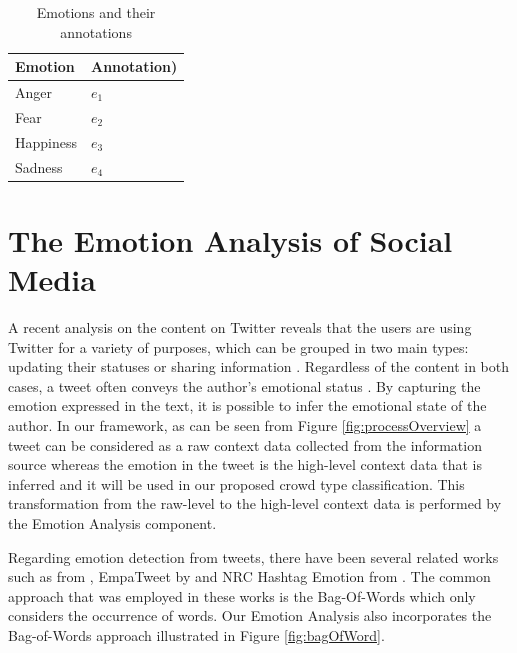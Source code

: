 \begin{table}
\caption{Emotions and their annotations}
\label{table:emotionAnnotation}
\centering
\begin{tabular}{|l|l|}
\hline
\textbf{Emotion} & \textbf{Annotation)} \\ \hline \hline
Anger & \(e_1\) \\ \hline
Fear & \(e_2\) \\ \hline
Happiness & \(e_3\) \\ \hline
Sadness & \(e_4\) \\ \hline
\end{tabular}
\end{table}

\section{The Emotion Analysis of Social Media}

A recent analysis on the content on Twitter reveals that the users are using Twitter for a variety of purposes, which can be grouped in two main types: updating their statuses or sharing information \citep{java2007we}. Regardless of the content in both cases, a tweet often conveys the author's emotional status \citep{bollen2009modeling}. By capturing the emotion expressed in the text, it is possible to infer the emotional state of the author. In our framework, as can be seen from Figure \ref{fig:processOverview} a tweet can be considered as a raw context data collected from the information source whereas the emotion in the tweet is the high-level context data that is inferred and it will be used in our proposed crowd type classification. This transformation from the raw-level to the high-level context data is performed by the Emotion Analysis component. 

Regarding emotion detection from tweets, there have been several related works such as from \citet{bollen2009modeling}, EmpaTweet by \citet{roberts2012empatweet} and NRC Hashtag Emotion from \citet{mohammad2014using}. The common approach that was employed in these works is the Bag-Of-Words which only considers the occurrence of words. Our Emotion Analysis also incorporates the Bag-of-Words approach illustrated in Figure \ref{fig:bagOfWord}.

